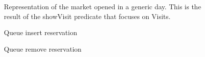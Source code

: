 \begin{figure}[H]

  \centering
  \caption{Representation of the market opened in a generic day. This is the result of the showVisit predicate that focuses on Visits.}
    \label{showVisit}

    
\end{figure}


\begin{figure}[H]
  \centering
    \caption{Queue insert reservation}
      \label{addInQueue}

\end{figure}


\begin{figure}[H]
  \centering
    \caption{Queue remove reservation}
      \label{deInQueue}

\end{figure}

